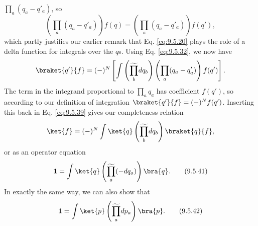 
$\prod_a(q_a-q'_a)$, so
\begin{equation}
\left(\prod_a(q_a-q'_a)\right)f(q)
=\left(\prod_a(q_a-q'_a)\right)f(q'),
\tag{9.5.40}\label{eq:9.5.40}
\end{equation}
which partly justifies our earlier remark that Eq. \eqref{eq:9.5.20} plays the role of a
delta function for integrals over the $q$s. Using Eq. \eqref{eq:9.5.32}, we now have
\[
\braket{q'}{f}=(-)^N\left[
 \int\left(\widetilde{\prod_b}dq_b\right)
 \left(\prod_a(q_a-q'_a)\right)f(q')\right].
\]
The term in the integrand proportional to $\prod_aq_a$ has coefficient
$f(q')$, so according to our definition of integration
$\braket{q'}{f}=(-)^Nf(q')$. Inserting this back in Eq. \eqref{eq:9.5.39} gives our
completeness relation
\[
\ket{f}=(-)^N\int\ket{q}
 \left(\widetilde{\prod_b}dq_b\right)\braket{q}{f},
\]
or as an operator equation
\begin{equation}
\mathbf{1}=\int\ket{q}
 \left(\widetilde{\prod_a}(-dq_a)\right)\bra{q}.
\tag{9.5.41}\label{eq:9.5.41}
\end{equation}
In exactly the same way, we can also show that
\begin{equation}
\mathbf{1}=\int\ket{p}
 \left(\widetilde{\prod_a}dp_a\right)\bra{p}.
\tag{9.5.42}\label{eq:9.5.42}
\end{equation}


